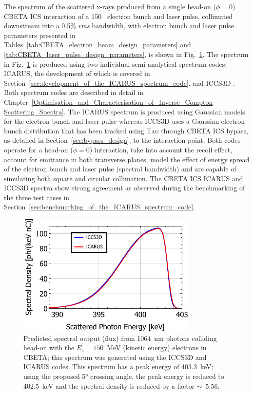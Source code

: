 \documentclass[../main.tex]{subfiles}
\begin{document}
The spectrum of the scattered x-rays produced from a single head-on ($\phi = 0$) CBETA ICS interaction of a 150~\Si{\mega\electrnvolt} electron bunch and laser pulse, collimated downstream into a 0.5\% \textit{rms} bandwidth, with electron bunch and laser pulse parameters presented in Tables~\ref{tab:CBETA_electron_beam_design_parameters} and \ref{tab:CBETA_laser_pulse_design_parameters}, is shown in Fig.~\ref{fig:CBETA_spectrum_benchmarking}. The spectrum in Fig.~\ref{fig:CBETA_spectrum_benchmarking} is produced using two individual semi-analytical spectrum codes: \textsc{ICARUS}, the development of which is covered in Section~\ref{sec:development_of_the_ICARUS_spectrum_code}, and \textsc{ICCS3D} \cite{krafft2016laser,ranjan2018simulation}. Both spectrum codes are described in detail in Chapter~\ref{Optimisation_and_Characterisation_of_Inverse_Compton Scattering_Spectra}. The \textsc{ICARUS} spectrum is produced using Gaussian models for the electron bunch and laser pulse whereas \textsc{ICCS3D} uses a Gaussian electron bunch distribution that has been tracked using \textsc{Tao} through CBETA ICS bypass, as detailed in Section~\ref{sec:bypass_design}, to the interaction point. Both codes operate for a head-on ($\phi=0$) interaction, take into account the recoil effect, account for emittance in both transverse planes, model the effect of energy spread of the electron bunch and laser pulse (spectral bandwidth) and are capable of simulating both square and circular collimation. The CBETA ICS \textsc{ICARUS} and \textsc{ICCS3D} spectra show strong agreement as observed during the benchmarking of the three test cases in Section~\ref{sec:benchmarking_of_the_ICARUS_spectrum_code}.

\begin{figure}[!h]
\centering
\includegraphics[width=0.8\textwidth]{Figures/CBETA_Inverse_Compton_Source_Design/CBETA150_spectrum_FINAL.pdf}
\caption{Predicted spectral output (flux) from 1064~\si{\nano\meter} photons colliding head-on with the $E_e =150$~\si{\mega\electronvolt} (kinetic energy) electrons in CBETA; this spectrum was generated using the \textsc{ICCS3D} and \textsc{ICARUS} codes. This spectrum has a peak energy of 403.3~\si{\kilo\electronvolt}; using the proposed 5\si{\degree} crossing angle, the peak energy is reduced to 402.5~\si{\kilo\electronvolt} and the spectral density is reduced by a factor $\sim$~5.56.}
\label{fig:CBETA_spectrum_benchmarking}
\end{figure}
\end{document}
